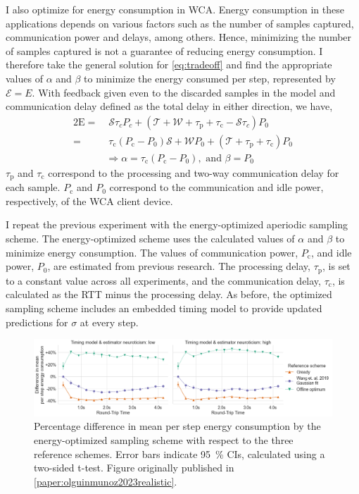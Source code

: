 I also optimize for energy consumption in \gls{WCA}.
Energy consumption in these applications depends on various factors such as the number of samples captured, communication power and delays, among others.
Hence, minimizing the number of samples captured is not a guarantee of reducing energy consumption.
I therefore take the general solution for \cref{eq:tradeoff} and find the appropriate values of \ensuremath{\alpha} and \ensuremath{\beta} to minimize the energy consumed per step, represented by \ensuremath{\mathcal{E}=E}.
With feedback given even to the discarded samples in the model and communication delay defined as the total delay in either direction, we have,
\begin{alignat}{2}
    \mathrm{E}=&\;\mathcal{S}\tau_cP_c+(\mathcal{T}+\mathcal{W}+\tau_\mathrm{p}+\tau_\mathrm{c}-\mathcal{S}\tau_c)P_0\nonumber\\
    =&\;\tau_{\text{c}}(P_{\text{c}} -P_0)\mathcal{S}+\mathcal{W}P_0+(\mathcal{T}+\tau_{\text{p}} +\tau_{\text{c}}) P_0\nonumber\\
    &\Rightarrow \alpha=\tau_{\text{c}}(P_{\text{c}} -P_0),\text{ and }\beta=P_0
\end{alignat}
\( \tau_\text{p} \) and \( \tau_\text{c} \) correspond to the processing and two-way communication delay for each sample.
\( P_\text{c} \) and \( P_0 \) correspond to the communication and idle power, respectively, of the \gls{WCA} client device.

I repeat the previous experiment with the energy-optimized aperiodic sampling scheme.
The energy-optimized scheme uses the calculated values of \ensuremath{\alpha} and \ensuremath{\beta} to minimize energy consumption.
The values of communication power, \ensuremath{P_{\text{c}}}, and idle power, \ensuremath{P_0}, are estimated from previous research.
The processing delay, \ensuremath{\tau_{\text{p}}}, is set to a constant value across all experiments, and the communication delay, \ensuremath{\tau_{\text{c}}}, is calculated as the \gls{RTT} minus the processing delay.
As before, the optimized sampling scheme includes an embedded timing model to provide updated predictions for \ensuremath{\sigma} at every step.

\begin{figure}
    \centering
    \includegraphics[width=\textwidth]{publications/2023EdgeDroid2/figs/new_model/energy_optimization_diff}
    \caption{%
        Percentage difference in mean per step energy consumption by the energy-optimized sampling scheme with respect to the three reference schemes.
        Error bars indicate \SI{95}{\percent} \glspl{CI}, calculated using a two-sided t-test.
        Figure originally published in \cref{paper:olguinmunoz2023realistic}.
    }\label{fig:energyresults}
\end{figure}


